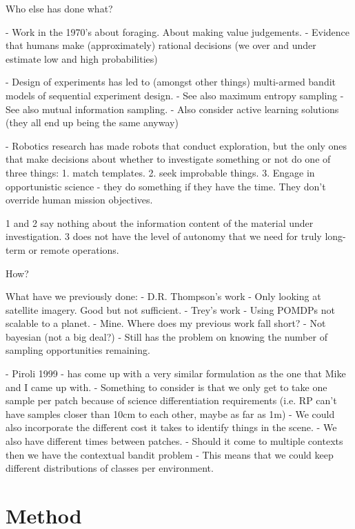 \documentclass[preprint,12pt,3p]{elsarticle}
\begin{document}
	Who else has done what?

	- Work in the 1970's about foraging.  About making value judgements.
- Evidence that humans make (approximately) rational decisions (we over and under estimate low and high probabilities)

	- Design of experiments has led to (amongst other things) multi-armed bandit models of sequential experiment design.
	- See also maximum entropy sampling
	- See also mutual information sampling.
- Also consider active learning solutions (they all end up being the same anyway)

	- Robotics research has made robots that conduct exploration, but the only ones that make decisions about whether to investigate something or not do one of three things:
	1. match templates.
	2. seek improbable things.
	3. Engage in opportunistic science - they do something if they have the time.  They don't override human mission objectives.

	1 and 2 say nothing about the information content of the material under investigation.
	3 does not have the level of autonomy that we need for truly long-term or remote operations.

	How?

	What have we previously done:
	- D.R. Thompson's work
	- Only looking at satellite imagery.  Good but not sufficient.
	- Trey's work
	- Using POMDPs not scalable to a planet.
	- Mine. Where does my previous work fall short?
- Not bayesian (not a big deal?)
	- Still has the problem on knowing the number of sampling opportunities remaining.

	- Piroli 1999 - has come up with a very similar formulation as the one that 
		Mike and I came up with.
		- Something to consider is that we only get to take one sample per patch 
			because of science differentiation requirements (i.e. RP can't have 
			samples closer than 10cm to each other, maybe as far as 1m)
		- We could also incorporate the different cost it takes to identify things 
			in the scene.
		- We also have different times between patches.
		- Should it come to multiple contexts then we have the contextual bandit 
			problem
				- This means that we could keep different distributions of classes per 
					environment.




\section{Method}
\label{sec:method}
\end{document}
